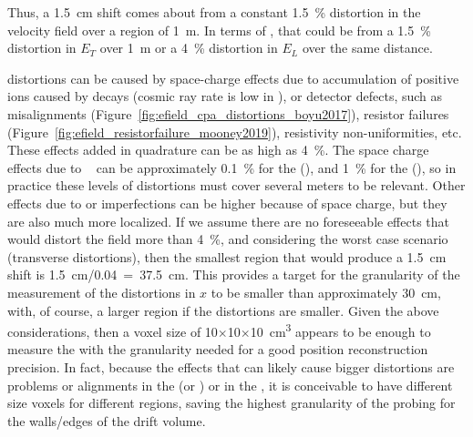 Thus, a \SI{1.5}{\cm} shift comes about from a constant \SI{1.5}{\%} distortion in the velocity field over a region of \SI{1}{\m}. In terms of \efield, that could be from a \SI{1.5}{\%} distortion in $E_T$ over \SI{1}{\m} or a \SI{4}{\%} distortion in $E_L$ over the same distance.

\efield distortions can be caused by space-charge effects due to accumulation of positive ions caused by  decays (cosmic ray rate is low in ), or detector defects, such as  misalignments (Figure~\ref{fig:efield_cpa_distortions_boyu2017}),  resistor failures (Figure~\ref{fig:efield_resistorfailure_mooney2019}), resistivity non-uniformities, etc.
These effects added in quadrature can be as high as \SI{4}{\%}. 
The space charge effects due to ~\cite{bib:mooney2018} can be approximately \SI{0.1}{\%} for the  (), and \SI{1}{\%} for the  (), so in practice these levels of 
distortions must cover several meters to be relevant.
Other effects due to  or  imperfections can be higher because of space charge, but they are also much more localized. If we assume there are no foreseeable effects that would distort the field more than \SI{4}{\%}, and considering the worst case scenario (transverse distortions), then the smallest region that would produce a \SI{1.5}{\cm} shift is \SI{1.5}{\cm}/\num{0.04}~=~\SI{37.5}{\cm}. This provides a target for the granularity of the measurement of the \efield distortions in $x$ to be smaller than approximately \SI{30}{\cm}, with, of course, a larger region if the distortions are smaller. Given the above considerations, then a voxel size of \num{10}$\times$\num{10}$\times$\SI{10}{\cubic\cm} appears to be enough to measure the \efield with the granularity needed for a good position reconstruction precision. In fact, because the effects that can likely cause bigger \efield distortions are problems or alignments in the  (or ) or in the , it is conceivable to have different size voxels for different regions, saving the highest granularity of the probing for the walls/edges of the drift volume.


\begin{comment}
\begin{dunetable}
[Calibration Requirements]
{p{0.5\textwidth}p{0.15\textwidth}p{0.15\textwidth}}
{tab:calibreq}
{Calibration Specifications and Goals}   
Requirement & Specification & Goal \\ \toprowrule
\efield measurement precision & < 1\% & ALARA \\ \colhline
\efield measurement coverage & > 75\% & AHARA \\ \colhline
\efield measurement granularity & < 30x30x30 cm & ALARA \\ 
\end{dunetable}
\end{comment}

